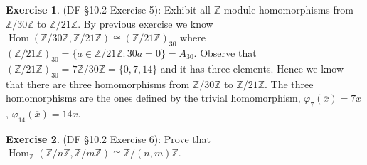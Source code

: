 \documentclass[8pt]{amsart}
\theoremstyle{plain}%
\theoremstyle{definition}
\newtheorem*{exercise}{Exercise}%
\theoremstyle{remark}
\numberwithin{equation}{section}
\newcommand{\Z}{\mathbb{Z}}
\begin{document}
\begin{exercise}
(DF \S 10.2 Exercise 5): Exhibit all $\Z$-module homomorphisms from $\Z/30\Z$ to $\Z/21\Z$.
	By previous exercise we know $\operatorname{Hom}(\Z/30\Z, \Z/21\Z) \cong (\Z/21\Z)_{30}$ where $(\Z/21\Z)_{30} = \{a \in \Z/21\Z : 30a = 0\} = A_{30}$. Observe that $(\Z/21\Z)_{30} = 7\Z/30\Z = \{0, 7, 14\}$ and it has three elements. Hence we know that there are three homomorphisms from $\Z/30\Z$ to $\Z/21\Z$. The three homomorphisms are the ones defined by the trivial homomorphism, $\varphi_7(\overline x) = 7x$, $\varphi_{14}(\overline x) = 14x$.
\end{exercise}

\begin{exercise}
(DF \S 10.2 Exercise 6): Prove that $\operatorname{Hom}_\Z(\Z/n\Z, \Z/m\Z) \cong \Z/(n, m)\Z$.
\end{exercise}
\end{document}
